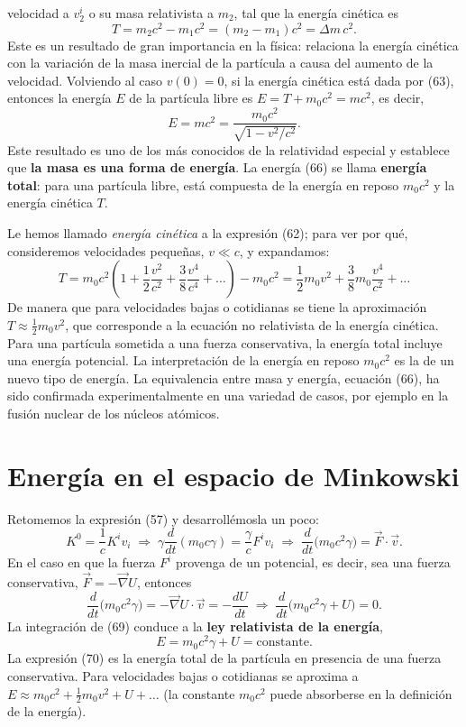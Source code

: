 velocidad a $v^i_2$ o su masa relativista a $m_2$, tal que la energía
cinética es
\[
T = m_2c^2-m_1c^2 = (m_2-m_1)c^2 = \Delta m\,c^2 . \tag{65}
\]
Este es un resultado de gran importancia en la física: relaciona la
energía cinética con la variación de la masa inercial de la partícula a
causa del aumento de la velocidad. Volviendo al caso $v(0)=0$, si la
energía cinética está dada por (63), entonces la energía $E$ de la
partícula libre es $E=T+m_0c^2=mc^2$, es decir,
\[
E = mc^2 = \frac{m_0c^2}{\sqrt{1-v^2/c^2}} . \tag{66}
\]
Este resultado es uno de los más conocidos de la relatividad especial y
establece que \textbf{la masa es una forma de energía}. La energía (66)
se llama \textbf{energía total}: para una partícula libre, está
compuesta de la energía en reposo $m_0c^2$ y la energía cinética $T$.

Le hemos llamado \emph{energía cinética} a la expresión (62); para ver
por qué, consideremos velocidades pequeñas, $v\ll c$, y expandamos:
\[
T = m_0c^2\left(1+\frac12\frac{v^2}{c^2}+\frac38\frac{v^4}{c^4}+\dots
\right)-m_0c^2 = \frac12m_0v^2+\frac38m_0\frac{v^4}{c^2}+\dots \tag{67}
\]
De manera que para velocidades bajas o cotidianas se tiene la
aproximación $T\approx\frac12m_0v^2$, que corresponde a la ecuación no
relativista de la energía cinética. Para una partícula sometida a una
fuerza conservativa, la energía total incluye una energía potencial. La
interpretación de la energía en reposo $m_0c^2$ es la de un nuevo tipo
de energía. La equivalencia entre masa y energía, ecuación (66), ha sido
confirmada experimentalmente en una variedad de casos, por ejemplo en la
fusión nuclear de los núcleos atómicos.

\section{Energía en el espacio de Minkowski}

Retomemos la expresión (57) y desarrollémosla un poco:
\[
K^0 = \frac1cK^iv_i \;\Rightarrow\; \gamma\frac{d}{dt}(m_0c\gamma) =
\frac\gamma cF^iv_i \;\Rightarrow\; \frac{d}{dt}\big(m_0c^2\gamma\big) =
\vec F\cdot\vec v . \tag{68}
\]
En el caso en que la fuerza $F^i$ provenga de un potencial, es decir,
sea una fuerza conservativa, $\vec F=-\vec\nabla U$, entonces
\[
\frac{d}{dt}\big(m_0c^2\gamma\big) = -\vec\nabla U\cdot\vec v = -
\frac{dU}{dt} \;\Longrightarrow\; \frac{d}{dt}\big(m_0c^2\gamma+U\big) =
0. \tag{69}
\]
La integración de (69) conduce a la \textbf{ley relativista de la
energía},
\[
E = m_0c^2\gamma+U = \text{constante}. \tag{70}
\]
La expresión (70) es la energía total de la partícula en presencia de una
fuerza conservativa. Para velocidades bajas o cotidianas se aproxima a
$E\approx m_0c^2+\frac12m_0v^2+U+\dots$ (la constante $m_0c^2$ puede
absorberse en la definición de la energía).


